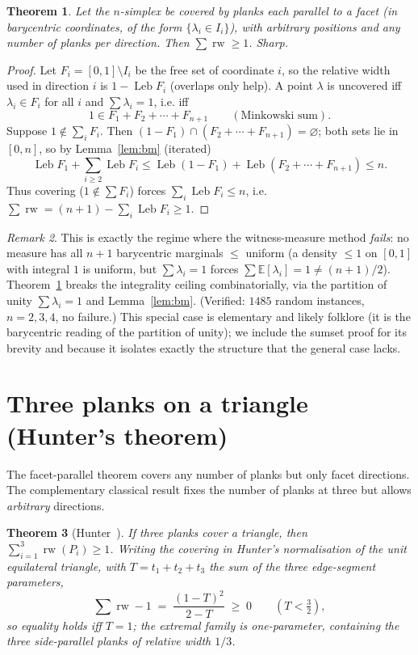 \documentclass[11pt]{article}
\theoremstyle{plain}
\newtheorem{theorem}{Theorem}
\theoremstyle{remark}
\newtheorem{remark}[theorem]{Remark}
\newcommand{\rw}{\operatorname{rw}}
\newcommand{\Leb}{\operatorname{Leb}}
\begin{document}
\begin{theorem}\label{thm:facet}
Let the $n$-simplex be covered by planks each parallel to a facet (in
barycentric coordinates, of the form $\{\lambda_i\in I_i\}$), with arbitrary
positions and any number of planks per direction. Then $\sum\rw\ge1$. Sharp.
\end{theorem}
\begin{proof}
Let $F_i=[0,1]\setminus I_i$ be the free set of coordinate $i$, so the relative
width used in direction $i$ is $1-\Leb F_i$ (overlaps only help). A point
$\lambda$ is uncovered iff $\lambda_i\in F_i$ for all $i$ and $\sum\lambda_i=1$,
i.e. iff
\[
   1\in F_1+F_2+\cdots+F_{n+1}\qquad(\text{Minkowski sum}).
\]
Suppose $1\notin\sum_i F_i$. Then $(1-F_1)\cap(F_2+\cdots+F_{n+1})=\varnothing$;
both sets lie in $[0,n]$, so by Lemma~\ref{lem:bm} (iterated)
\[
   \Leb F_1+\sum_{i\ge2}\Leb F_i\le
   \Leb(1-F_1)+\Leb(F_2+\cdots+F_{n+1})\le n .
\]
Thus covering ($1\notin\sum F_i$) forces $\sum_i\Leb F_i\le n$, i.e.
$\sum\rw=(n{+}1)-\sum_i\Leb F_i\ge1$.
\end{proof}

\begin{remark}
This is exactly the regime where the witness-measure method \emph{fails}: no
measure has all $n{+}1$ barycentric marginals $\le$ uniform (a density $\le1$ on
$[0,1]$ with integral $1$ is uniform, but $\sum\lambda_i=1$ forces
$\sum\mathbb E[\lambda_i]=1\ne(n{+}1)/2$). Theorem~\ref{thm:facet} breaks the
integrality ceiling combinatorially, via the partition of unity $\sum\lambda_i=1$
and Lemma~\ref{lem:bm}. (Verified: $1485$ random instances, $n=2,3,4$, no
failure.) This special case is elementary and likely folklore (it is the
barycentric reading of the partition of unity); we include the sumset proof for its
brevity and because it isolates exactly the structure that the general case lacks.
\end{remark}

\section{Three planks on a triangle (Hunter's theorem)}
The facet-parallel theorem covers any number of planks but only facet directions.
The complementary classical result fixes the number of planks at three but allows
\emph{arbitrary} directions.

\begin{theorem}[Hunter~\cite{hunter1993}]\label{thm:hunter}
If three planks cover a triangle, then $\sum_{i=1}^3\rw(P_i)\ge1$. Writing the
covering in Hunter's normalisation of the unit equilateral triangle, with
$T=t_1+t_2+t_3$ the sum of the three edge-segment parameters,
\[
   \sum\rw -1 \;=\; \frac{(1-T)^2}{2-T}\;\ge\;0\qquad(T<\tfrac32),
\]
so equality holds iff $T=1$; the extremal family is one-parameter, containing the
three side-parallel planks of relative width $1/3$.
\end{theorem}
\end{document}
